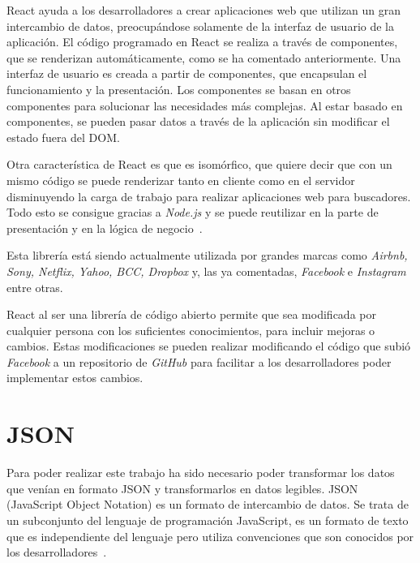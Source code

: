 \documentclass[a4paper, 12pt]{book}
\begin{document}
\vspace{5mm}
React ayuda a los desarrolladores a crear aplicaciones web que utilizan un gran intercambio de datos, preocupándose solamente de la interfaz de usuario de la aplicación. El código programado en React se realiza a través de componentes, que se renderizan automáticamente, como se ha comentado anteriormente. Una interfaz de usuario es creada a partir de componentes, que encapsulan el funcionamiento y la presentación. Los componentes se basan en otros componentes para solucionar las necesidades más complejas. Al estar basado en componentes, se pueden pasar datos a través de la aplicación sin modificar el estado fuera del DOM.

\vspace{5mm}
Otra característica de React es que es isomórfico, que quiere decir que con un mismo código se puede renderizar tanto en cliente como en el servidor disminuyendo la carga de trabajo para realizar aplicaciones web para buscadores. Todo esto se consigue gracias a \textit{Node.js} y se puede reutilizar en la parte de presentación y en la lógica de negocio~\cite{react_manual}.

\vspace{5mm}
Esta librería está siendo actualmente utilizada por grandes marcas como \textit{Airbnb, Sony, Netflix, Yahoo, BCC, Dropbox} y, las ya comentadas, \textit{Facebook} e \textit{Instagram} entre otras.


\vspace{5mm}
React al ser una librería de código abierto permite que sea modificada por cualquier persona con los suficientes conocimientos, para incluir mejoras o cambios. Estas modificaciones se pueden realizar modificando el código que subió \textit{Facebook} a un repositorio de \textit{GitHub} para facilitar a los desarrolladores poder implementar estos cambios.



\section{JSON}
\label{subsec:json}
Para poder realizar este trabajo ha sido necesario poder transformar los datos que venían en formato JSON y transformarlos en datos legibles. JSON (JavaScript Object Notation) es un formato de intercambio de datos. Se trata de un subconjunto del lenguaje de programación JavaScript, es un formato de texto que es independiente del lenguaje pero utiliza convenciones que son conocidos por los desarrolladores~\cite{json_misc}.
\end{document}
